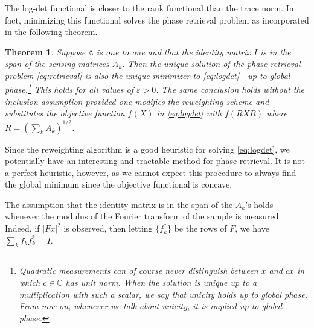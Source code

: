 \documentclass[11pt]{article}
\newtheorem{theorem}{Theorem}[section]
\newcommand{\C}{\mathbb{C}}
\newcommand{\<}{\langle}
\renewcommand{\>}{\rangle}
\newcommand{\mapA}{\mathbb{A}}
\numberwithin{equation}{section}
\renewcommand{\epsilon}{\varepsilon}
\begin{document}
The log-det functional is closer to the rank functional than the trace
norm. In fact, minimizing this functional solves the phase retrieval
problem as incorporated in the following theorem.
\begin{theorem}
\label{teo:reweight}
Suppose $\mapA$ is one to one and that the identity matrix $I$ is in
the span of the sensing matrices $A_k$.
Then the unique solution of the phase retrieval problem
\eqref{eq:retrieval} is also the unique minimizer to
\eqref{eq:logdet}---up to global phase.\footnote{Quadratic
  measurements can of course never distinguish between $x$ and $c x$
  in which $c \in \C$ has unit norm. When the solution is unique up to
  a multiplication with such a scalar, we say that unicity holds up to
  global phase. From now on, whenever we talk about unicity, it is
  implied up to global phase.} This holds for all values of $\epsilon
> 0$. The same conclusion holds without the inclusion assumption
provided one modifies the reweighting scheme and substitutes the
objective function $f(X)$ in \eqref{eq:logdet} with $f(R X R)$ where
$R = (\sum_k A_k)^{1/2}$.
\end{theorem}
Since the reweighting algorithm is a good heuristic for solving
\eqref{eq:logdet}, we potentially have an interesting and tractable
method for phase retrieval. It is not a perfect heuristic, however, as
we cannot expect this procedure to always find the global minimum
since the objective functional is concave.


The assumption that the identity matrix is in the span of the $A_k$'s
holds whenever the modulus of the Fourier transform of the sample is
measured.  Indeed, if $|F x|^2$ is observed, then letting $\{f_k^*\}$
be the rows of $F$, we have $\sum_k f_k f_k^* = I$.
\end{document}
